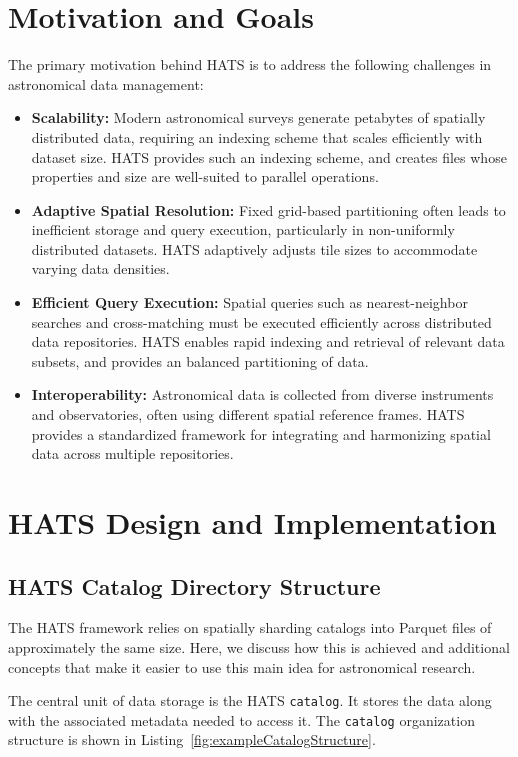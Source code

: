 \documentclass[11pt,a4paper]{ivoa}
\begin{document}
\section{Motivation and Goals}
The primary motivation behind HATS is to address the following challenges in astronomical data management:
\begin{itemize}
    \item \textbf{Scalability:} Modern astronomical surveys generate petabytes of spatially distributed data, requiring an indexing scheme that scales efficiently with dataset size.
    HATS provides such an indexing scheme, and creates files whose properties and size are well-suited to parallel operations.
    \item \textbf{Adaptive Spatial Resolution:} Fixed grid-based partitioning often leads to inefficient storage and query execution, particularly in non-uniformly distributed datasets. 
    HATS adaptively adjusts tile sizes to accommodate varying data densities.
    \item \textbf{Efficient Query Execution:} Spatial queries such as nearest-neighbor searches and cross-matching must be executed efficiently across distributed data repositories. 
    HATS enables rapid indexing and retrieval of relevant data subsets, and provides an balanced partitioning of data.
    \item \textbf{Interoperability:} Astronomical data is collected from diverse instruments and observatories, often using different spatial reference frames. 
    HATS provides a standardized framework for integrating and harmonizing spatial data across multiple repositories.
\end{itemize}

\section{HATS Design and Implementation}

\subsection{HATS Catalog Directory Structure} \label{sec:catalog}

The HATS framework relies on spatially sharding catalogs into Parquet files of approximately the same size. 
Here, we discuss how this is achieved and additional concepts that make it easier to use this main idea for astronomical research.

The central unit of data storage is the HATS \texttt{catalog}. 
It stores the data along with the associated metadata needed to access it. 
The  \texttt{catalog} organization structure is shown in Listing~\ref{fig:exampleCatalogStructure}.
\end{document}
